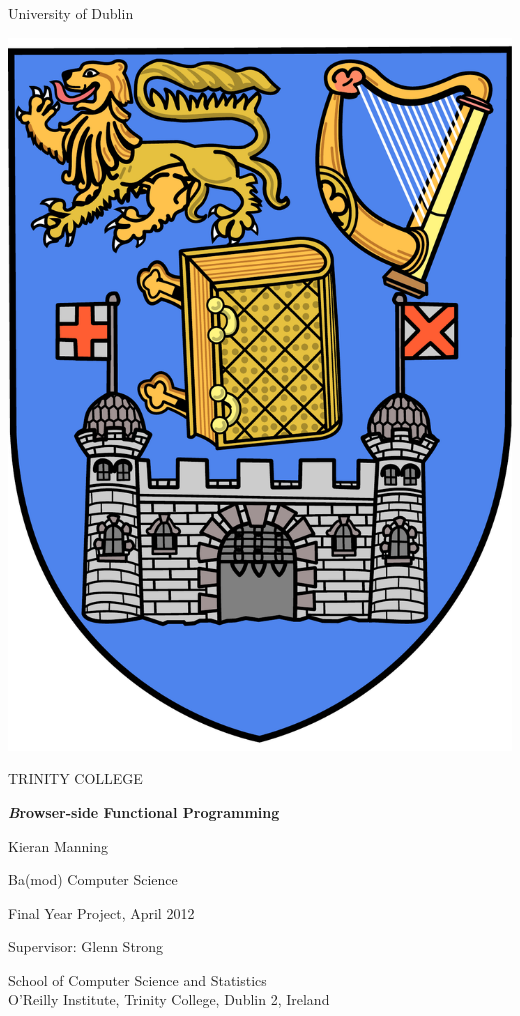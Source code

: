 
    
\thispagestyle{empty}
\begin{center}
{\sffamily
{\huge University of Dublin}
 
\vspace{10pt}
 
\includegraphics[scale=0.1]{trinitycollege.pdf}
 
\vspace{10pt}
 
{\Huge TRINITY COLLEGE}
 
\vspace{60pt}
 
\textbf{ \Large \emph Browser-side Functional Programming}
 
\vspace{20pt}
 
Kieran Manning
 
\vspace{20pt}
 
Ba(mod) Computer Science
 
Final Year Project, April 2012
 
Supervisor: Glenn Strong
 
\vspace{100pt}
 
School of Computer Science and Statistics \\
O'Reilly Institute, Trinity College, Dublin 2, Ireland
}
\end{center}

